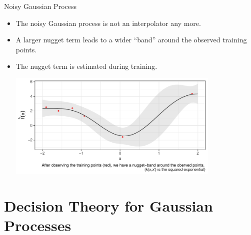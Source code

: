 \begin{vbframe}{Noisy Gaussian Process}
\begin{itemize}
\framebreak 

\item The noisy Gaussian process is not an interpolator any more.
\item A larger nugget term leads to a wider ``band'' around the observed training points.
\item The nugget term is estimated during training.


\begin{center}
    \includegraphics[width=0.8\textwidth]{figure/gp_pred/gp_regression.pdf}
\end{center}
\end{itemize}

\end{vbframe}



\section{Decision Theory for Gaussian Processes}

